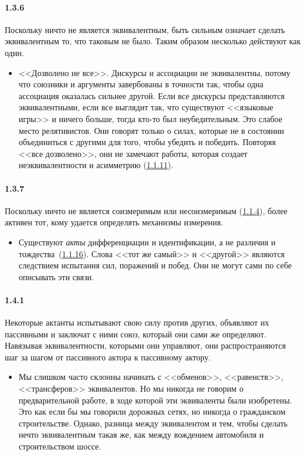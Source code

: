 \paragraph{1.3.6}\hypertarget{par:1.3.6}{} Поскольку ничто не является эквивалентным, быть сильным означает сделать эквивалентным то, что таковым не было. Таким образом несколько действуют как один.
	\begin{itemize}
	\item <<Дозволено не все>>. Дискурсы и ассоциации не эквивалентны, потому что союзники и аргументы завербованы в точности так, чтобы одна ассоциация оказалась сильнее другой. Если все дискурсы представляются эквивалентными, если все выглядит так, что существуют <<языковые игры>> и ничего больше, тогда кто-то был неубедительным. Это слабое место релятивистов. Они говорят только о силах, которые не в состоянии объединиться с другими для того, чтобы убедить и победить. Повторяя <<все дозволено>>, они не замечают работы, которая создает неэквивалентности и асимметрию (\hyperlink{par:1.1.11}{1.1.11}).
	\end{itemize}

\paragraph{1.3.7}\hypertarget{par:1.3.7}{} Поскольку ничто не является соизмеримым или несоизмеримым (\hyperlink{par:1.1.4}{1.1.4}), более активен тот, кому удается определять механизмы измерения.
	\begin{itemize}
	\item Существуют {\itshape акты} дифференциации и идентификации, а не различия и тождества~(\hyperlink{par:1.1.16}{1.1.16}). Слова <<тот же самый>> и <<другой>> являются следствием испытания сил, поражений и побед. Они не могут сами по себе описывать эти связи.
	\end{itemize}


\paragraph{1.4.1}\hypertarget{par:1.4.1}{} Некоторые актанты испытывают свою силу против других, объявляют их пассивными и заключат с ними союз, который они сами же определяют. Навязывая эквивалентности, которыми они управляют, они распространяются шаг за шагом от пассивного актора к пассивному актору.
	\begin{itemize}
	\item Мы слишком часто склонны начинать с <<обменов>>, <<равенств>>, <<трансферов>> эквивалентов. Но мы никогда не говорим о предварительной работе, в ходе которой эти эквиваленты были изобретены. Это как если бы мы говорили дорожных сетях, но никогда о гражданском строительстве. Однако, разница между эквивалентом и тем, чтобы сделать нечто эквивалентным такая же, как между вождением автомобиля и строительством шоссе.
	\end{itemize}

